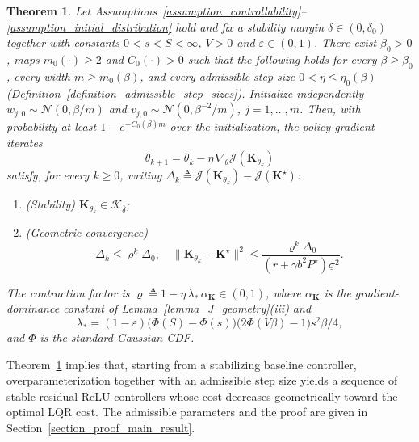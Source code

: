 \documentclass[letterpaper, 10 pt, conference]{ieeeconf}
\newcommand{\bK}{\mathbf{K}}
\newcommand{\cJ}{\mathcal{J}}
\newcommand{\cK}{\mathcal{K}}
\newcommand{\cN}{\mathcal{N}}
\newcommand{\slo}{\underline{\sigma}}
\newtheorem{theorem}{Theorem}
\newcommand{\Lemm}{Lemma}
\newcommand{\Thm}{Theorem}
\newcommand{\Sect}{Section}
\newcommand{\Defn}{Definition}
\begin{document}
\begin{theorem}\label{theorem_main_result}
    Let Assumptions~\ref{assumption_controllability}--\ref{assumption_initial_distribution} hold and fix a stability margin $\delta \in (0,\delta_{0})$ together with constants $0 < s < S < \infty$, $V > 0$ and $\varepsilon \in (0,1)$. There exist $\beta_{0} > 0$, maps $m_{0}(\cdot)\ge2$ and $C_{0}(\cdot)>0$ such that the following holds for every $\beta \ge \beta_{0}$, every width $m \ge m_{0}(\beta)$, and every admissible step size $0<\eta\le\eta_0(\beta)$ (\Defn~\ref{definition_admissible_step_sizes}). Initialize independently $w_{j,0} \sim \cN(0,{\beta}/{m})$ and $v_{j,0} \sim \cN(0,{\beta^{-2}}/{m})$, $j=1,\dots,m$. Then, with probability at least $1 - e^{-C_{0}(\beta)m}$ over the initialization, the policy-gradient iterates
    \begin{equation}\label{eq_update_rule}
        \theta_{k+1} = \theta_k - \eta\, \nabla_{\theta} \cJ(\bK_{\theta_{k}})
    \end{equation}
    satisfy, for every $k \ge 0$, writing $\Delta_{k} \triangleq \cJ(\bK_{\theta_{k}}) - \cJ(\bK^{\star})$:
    \begin{enumerate}[label=(\roman*),leftmargin=1.7em,itemsep=1pt,topsep=2pt,parsep=0pt]
        \item (Stability) $\bK_{\theta_{k}} \in \cK_{\overline{\delta}}$;
        \item (Geometric convergence)
        \begin{equation}
            \Delta_{k} \le \varrho^{k} \Delta_{0},
            \quad
            \|\bK_{\theta_{k}} {-} \bK^{\star}\|^2 \le \frac{\varrho^{k} \Delta_{0}}{(r {+} \gamma b^{2} P^\star)\slo^{2}}.
        \end{equation}        
    \end{enumerate}
    The contraction factor is $\varrho \triangleq 1 - \eta\, \lambda_{\ast}\, \alpha_{\bK} \in (0,1)$, where $\alpha_{\bK}$ is the gradient-dominance constant of \Lemm~\ref{lemma_J_geometry}(iii) and
    \begin{equation} \label{eq_lambda_star_thm}
        \lambda_{\ast}
        =
        (1 {-} \varepsilon) \bigl(\Phi(S) {-} \Phi(s)\bigr) \bigl(2 \Phi(V \beta) {-} 1\bigr) {s^{2} \beta}/{4},
    \end{equation}
    and $\Phi$ is the standard Gaussian CDF.
\end{theorem}
\Thm~\ref{theorem_main_result} implies that, starting from a stabilizing baseline controller, overparameterization together with an admissible step size yields a sequence of stable residual ReLU controllers whose cost decreases geometrically toward the optimal LQR cost. The admissible parameters and the proof are given in \Sect~\ref{section_proof_main_result}.
 
\end{document}

